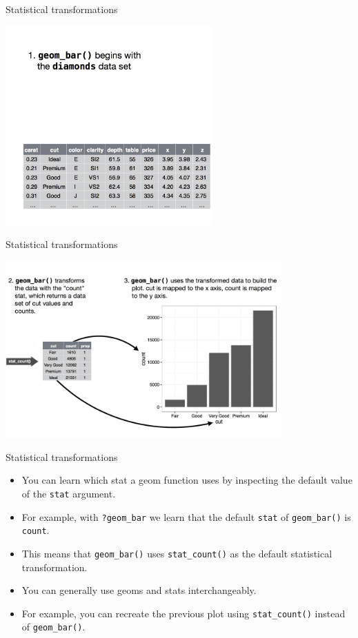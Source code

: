 \documentclass[ignorenonframetext,]{beamer}
\begin{document}
\begin{frame}{Statistical transformations}
\protect\hypertarget{statistical-transformations-2}{}

\includegraphics[width=3.125in,height=\textheight]{st1.png}

\end{frame}

\begin{frame}{Statistical transformations}
\protect\hypertarget{statistical-transformations-3}{}

\includegraphics[width=4.16667in,height=\textheight]{st2.png}

\end{frame}

\begin{frame}[fragile]{Statistical transformations}
\protect\hypertarget{statistical-transformations-4}{}

\begin{itemize}
\item
  You can learn which stat a geom function uses by inspecting the
  default value of the \texttt{stat} argument.
\item
  For example, with \texttt{?geom\_bar} we learn that the default
  \texttt{stat} of \texttt{geom\_bar()} is \texttt{count}.
\item
  This means that \texttt{geom\_bar()} uses \texttt{stat\_count()} as
  the default statistical transformation.
\item
  You can generally use geoms and stats interchangeably.
\item
  For example, you can recreate the previous plot using
  \texttt{stat\_count()} instead of \texttt{geom\_bar()}.
\end{itemize}

\end{frame}
\end{document}
